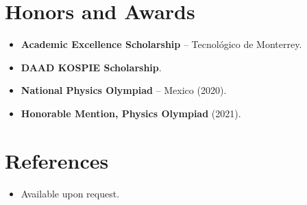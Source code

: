 \documentclass[11pt,a4paper,sans]{moderncv}
\begin{document}
\section{Honors and Awards}
\vspace{1pt}
\begin{itemize}
\item{\textbf{Academic Excellence Scholarship} -- Tecnológico de Monterrey.}
\item{\textbf{DAAD KOSPIE Scholarship}.}
\item{\textbf{National Physics Olympiad} -- Mexico (2020).}
\item{\textbf{Honorable Mention, Physics Olympiad} (2021).}
\end{itemize}


\section{References}
\vspace{1pt}
\begin{itemize}
\item{Available upon request.}
\end{itemize}
\end{document}
